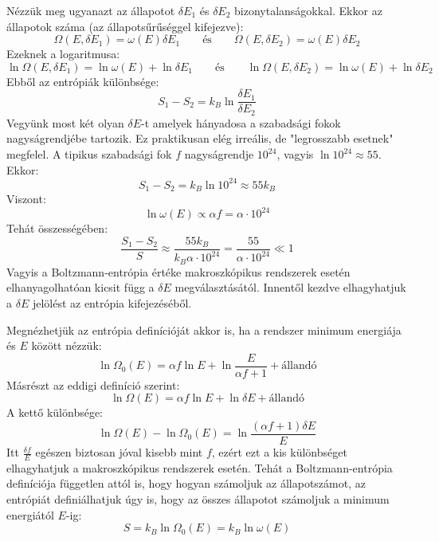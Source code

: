 \documentclass[../main.tex]{subfiles}
\begin{document}
Nézzük meg ugyanazt az állapotot $\delta E_1$ és $\delta E_2$ bizonytalanságokkal. Ekkor az állapotok száma (az állapotsűrűséggel kifejezve):
\begin{equation}
    \Omega(E, \delta E_1) = \omega(E) \delta E_1 \qquad \text{és} \qquad \Omega(E, \delta E_2) = \omega(E) \delta E_2
\end{equation}
Ezeknek a logaritmusa:
\begin{equation}
    \ln \Omega(E, \delta E_1) = \ln \omega(E) + \ln \delta E_1 \qquad \text{és} \qquad \ln \Omega(E, \delta E_2) = \ln \omega(E) + \ln \delta E_2
\end{equation}
Ebből az entrópiák különbsége:
\begin{equation}
    S_1 - S_2 = k_B \ln \frac{\delta E_1}{\delta E_2}
\end{equation}
Vegyünk most két olyan $\delta E$-t amelyek hányadosa a szabadsági fokok nagyságrendjébe tartozik. Ez praktikusan elég irreális, de "legrosszabb esetnek" megfelel. 
A tipikus szabadsági fok $f$ nagyságrendje $10^{24}$, vagyis $\ln 10^{24} \approx 55$. Ekkor:
\begin{equation}
    S_1 - S_2 = k_B \ln 10^{24} \approx 55 k_B
\end{equation}
Viszont:
\begin{equation}
    \ln \omega(E) \propto \alpha f = \alpha \cdot 10^{24}
\end{equation}
Tehát összességében:
\begin{equation}
    \frac{S_1 - S_2}{S} \approx \frac{55 k_B}{k_B \alpha \cdot 10^{24}} = \frac{55}{\alpha \cdot 10^{24}} \ll 1
\end{equation}
Vagyis a Boltzmann-entrópia értéke makroszkópikus rendszerek esetén elhanyagolhatóan kicsit függ a $\delta E$ megválasztásától. Innentől kezdve elhagyhatjuk a $\delta E$ jelölést az entrópia kifejezéséből.

Megnézhetjük az entrópia definícióját akkor is, ha a rendszer minimum energiája és $E$ között nézzük:
\begin{equation}
    \ln \Omega_0 (E) = \alpha f \ln E + \ln \frac{E}{\alpha f + 1} + \text{állandó}
\end{equation}
Másrészt az eddigi definíció szerint:
\begin{equation}
    \ln \Omega(E) = \alpha f \ln E + \ln \delta E + \text{állandó}
\end{equation}
A kettő különbsége:
\begin{equation}
    \ln \Omega(E) - \ln \Omega_0(E) = \ln \frac{(\alpha f + 1) \delta E}{E}
\end{equation}
Itt $\frac{\delta f}{E}$ egészen biztosan jóval kisebb mint $f$, ezért ezt a kis különbséget elhagyhatjuk a makroszkópikus rendszerek esetén. Tehát a Boltzmann-entrópia definíciója független attól is, hogy
hogyan számoljuk az állapotszámot, az entrópiát definiálhatjuk úgy is, hogy az összes állapotot számoljuk a minimum energiától $E$-ig:
\begin{equation}
    \boxed{S = k_B \ln \Omega_0(E) = k_B \ln \omega(E)}
\end{equation}
\end{document}
